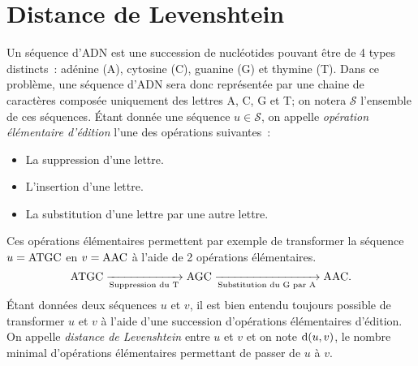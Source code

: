 \documentclass{magnolia}
\begin{document}

\section{Distance de Levenshtein}

Un séquence d'\textsc{ADN} est une succession de nucléotides pouvant être de 4 types
distincts~: adénine (A), cytosine (C), guanine (G) et thymine (T). Dans ce problème, une séquence d'\textsc{ADN}
sera donc représentée par une chaine de caractères composée uniquement des lettres A, C, G et T;
on notera $\mathcal{S}$ l'ensemble de ces séquences.  Étant donnée
une séquence $u\in\mathcal{S}$, on appelle \emph{opération élémentaire d'édition} l'une des opérations suivantes~:
\begin{itemize}
\item La suppression d'une lettre.
\item L'insertion d'une lettre.
\item La substitution d'une lettre par une autre lettre.
\end{itemize}
Ces opérations élémentaires permettent par exemple de transformer la séquence $u={\rm ATGC}$ en $v={\rm AAC}$ à
l'aide de 2 opérations élémentaires.
\[{\rm ATGC}
  \xrightarrow[\text{Suppression du T}]{}  {\rm AGC}
  \xrightarrow[\text{Substitution du G par A}]{} {\rm AAC}.\]
Étant données deux séquences $u$ et $v$, il est bien entendu toujours possible de transformer $u$ et $v$
à l'aide d'une succession d'opérations élémentaires d'édition. On appelle \emph{distance de Levenshtein} entre
$u$ et $v$ et on note ${\rm d}(u, v)$, le nombre minimal d'opérations élémentaires permettant de passer
de $u$ à $v$.
\end{document}
